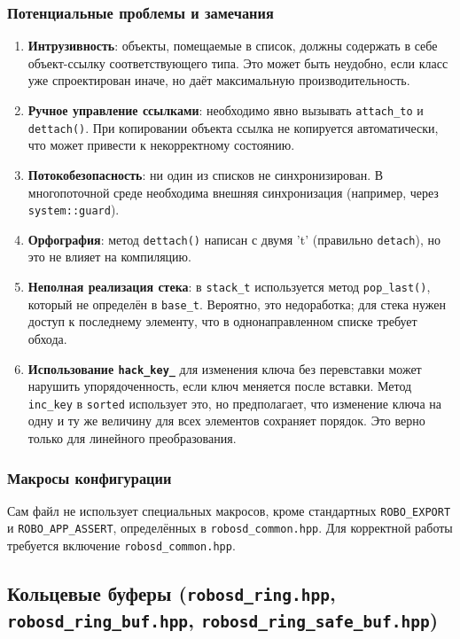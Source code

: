 \documentclass[a4paper,12pt]{article}
\begin{document}
\subsubsection{Потенциальные проблемы и замечания}

\begin{enumerate}
    \item \textbf{Интрузивность}: объекты, помещаемые в список, должны содержать в себе объект-ссылку соответствующего типа. Это может быть неудобно, если класс уже спроектирован иначе, но даёт максимальную производительность.
    \item \textbf{Ручное управление ссылками}: необходимо явно вызывать \texttt{attach\_to} и \texttt{dettach()}. При копировании объекта ссылка не копируется автоматически, что может привести к некорректному состоянию.
    \item \textbf{Потокобезопасность}: ни один из списков не синхронизирован. В многопоточной среде необходима внешняя синхронизация (например, через \texttt{system::guard}).
    \item \textbf{Орфография}: метод \texttt{dettach()} написан с двумя 't' (правильно \texttt{detach}), но это не влияет на компиляцию.
    \item \textbf{Неполная реализация стека}: в \texttt{stack\_t} используется метод \texttt{pop\_last()}, который не определён в \texttt{base\_t}. Вероятно, это недоработка; для стека нужен доступ к последнему элементу, что в однонаправленном списке требует обхода.
    \item \textbf{Использование \texttt{hack\_key\_}} для изменения ключа без перевставки может нарушить упорядоченность, если ключ меняется после вставки. Метод \texttt{inc\_key} в \texttt{sorted} использует это, но предполагает, что изменение ключа на одну и ту же величину для всех элементов сохраняет порядок. Это верно только для линейного преобразования.
\end{enumerate}

\subsubsection{Макросы конфигурации}

Сам файл не использует специальных макросов, кроме стандартных \texttt{ROBO\_EXPORT} и \texttt{ROBO\_APP\_ASSERT}, определённых в \texttt{robosd\_common.hpp}. Для корректной работы требуется включение \texttt{robosd\_common.hpp}.

\subsection{Кольцевые буферы (\texttt{robosd\_ring.hpp}, \texttt{robosd\_ring\_buf.hpp}, \texttt{robosd\_ring\_safe\_buf.hpp})}
\end{document}
